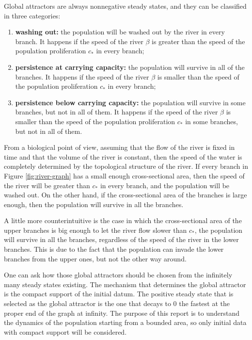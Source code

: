 Global attractors are always nonnegative steady states, and they can be classified in three categories:
\begin{enumerate}[label=(\roman*)]
    \item \textbf{washing out:} the population will be washed out by the river in every branch. It happens if the speed of the river \(\beta\) is greater than the speed of the population proliferation \(c_*\) in every branch;
    \item \textbf{persistence at carrying capacity:} the population will survive in all of the branches. It happens if the speed of the river \(\beta\) is smaller than the speed of the population proliferation \(c_*\) in every branch;
    \item \textbf{persistence below carrying capacity:} the population will survive in some branches, but not in all of them. It happens if the speed of the river \(\beta\) is smaller than the speed of the population proliferation \(c_*\) in some branches, but not in all of them.
\end{enumerate}

From a biological point of view, assuming that the flow of the river is fixed in time and that the volume of the river is constant, then the speed of the water is completely determined by the topological structure of the river. If every branch in Figure \ref{fig:river-graph} has a small enough cross-sectional area, then the speed of the river will be greater than \(c_*\) in every branch, and the population will be washed out. On the other hand, if the cross-sectional area of the branches is large enough, then the population will survive in all the branches.

A little more counterintuitive is the case in which the cross-sectional area of the upper branches is big enough to let the river flow slower than \(c_*\), the population will survive in all the branches, regardless of the speed of the river in the lower branches. This is due to the fact that the population can invade the lower branches from the upper ones, but not the other way around.

One can ask how those global attractors should be chosen from the infinitely many steady states existing. The mechanism that determines the global attractor is the compact support of the initial datum. The positive steady state that is selected as the global attractor is the one that decays to \(0\) the fastest at the proper end of the graph at infinity. The purpose of this report is to understand the dynamics of the population starting from a bounded area, so only initial data with compact support will be considered.

